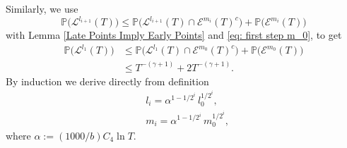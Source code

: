 \documentclass[11pt]{article}
\makeatletter
\renewenvironment{proof}[1][\proofname]{
   \par\pushQED{\qed}\normalfont
   \topsep6\p@\@plus6\p@\relax
   \trivlist\item[\hskip\labelsep\bfseries#1\@addpunct{.}]
   \ignorespaces
}{
   \popQED\endtrivlist\@endpefalse
}
\numberwithin{equation}{section}
\makeatother
\begin{document}
\begin{proof}[Proof of Theorem \ref{log fluctuation}]
  Similarly, we use 
  \begin{equation}\nonumber
    \mathbb{P} \big( \mathcal{L}^{l_{i+1}}(T) \big) 
    \leq 
    \mathbb{P} \big( \mathcal{L}^{l_{i+1}} (T) \cap 
    \mathcal{E}^{m_i}(T)^c \big) + 
    \mathbb{P} \big(\mathcal{E}^{m_i}(T) \big)
  \end{equation}
  with Lemma \ref{Late Points Imply Early Points} and \eqref{eq: first step m_0}, to get 
  \begin{equation}\label{eq: first step with l_1}
    \begin{split}
        \mathbb{P} \big(\mathcal{L}^{l_1}(T) \big) 
        & \leq \mathbb{P} \big(
          \mathcal{L}^{l_1}(T) \cap \mathcal{E}^{m_0}(T)^c \big) 
          +  \mathbb{P}(\mathcal{E}^{m_0}(T) \big)\\
      & \leq T^{-(\gamma +1)} + 2T^{-(\gamma +1)}.  
    \end{split}
  \end{equation}
  By induction we derive directly from definition
  \begin{equation}\label{eq: non recursive form}
    \begin{split}
      & l_i = \alpha^{1-1/2^i}\, l_0^{1/2^i},\\
      & m_i = \alpha^{1-1/2^i}\, m_0^{1/2^i},
    \end{split}
  \end{equation} 
  where $\alpha := (1000/b) C_4 \ln T$.


\end{proof}
\end{document}
